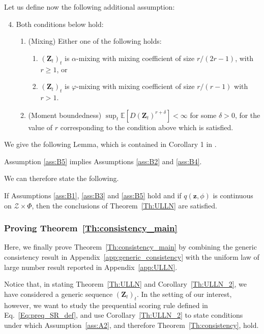 \documentclass[twoside,11pt]{article}
\newcommand{\E}{\mathbb{E}}
\newcommand{\ddz}{\mathbf{z}}
\newcommand{\Ddz}{\mathbf{Z}}
\begin{document}
	
	Let us define now the following additional assumption: 
	\begin{enumerate}[label=\textbf{C\arabic*}]
		\setcounter{enumi}{3}
		\item \label{ass:B5} 
		Both conditions below hold:
		\begin{enumerate}
			\item (Mixing) Either one of the following holds: 
			\begin{enumerate}
				\item $ (\Ddz_t)_t $ is $ \alpha $-mixing with mixing coefficient of size $ r/(2r-1) $, with $ r \ge 1 $, or
				\item $ (\Ddz_t)_t $ is $ \varphi $-mixing with mixing coefficient of size $ r/(r-1) $ with $ r > 1 $.
			\end{enumerate}
			\item  (Moment boundedness) $ \sup_t \E\left[D(\Ddz_t)^{r+\delta}\right] <\infty$ for some $ \delta>0 $, for the value of $ r $ corresponding to the condition above which is satisfied.
		\end{enumerate}
	\end{enumerate}
	
	
	We give the following Lemma, which is contained in Corollary 1 in \cite{potscher1989uniform}.
	
	\begin{lemma}
		Assumption \ref{ass:B5} implies Assumptions \ref{ass:B2} and \ref{ass:B4}.	
	\end{lemma}
	
	We can therefore state the following.
	\begin{corollary}\label{Th:ULLN_2}
		If Assumptions \ref{ass:B1}, \ref{ass:B3} and \ref{ass:B5} hold and if $ q(\ddz, \phi) $ is continuous on $ \mathcal{Z}\times \Phi $, then the conclusions of Theorem~\ref{Th:ULLN} are satisfied.
	\end{corollary}
	
	\subsubsection{Proving Theorem~\ref{Th:consistency_main}}\label{app:proof_consistency}
	Here, we finally prove Theorem~\ref{Th:consistency_main} by combining the generic consistency result in Appendix~\ref{app:generic_consistency} with the uniform law of large number result reported in Appendix~\ref{app:ULLN}.
	
	Notice that, in stating Theorem~\ref{Th:ULLN} and Corollary~\ref{Th:ULLN_2}, we have considered a generic sequence $  (\Ddz_t)_t  $. In the setting of our interest, however, we want to study the prequential scoring rule defined in Eq.~\eqref{Eq:preq_SR_def}, and use Corollary~\ref{Th:ULLN_2} to state conditions under which Assumption~\ref{ass:A2}, and therefore Theorem~\ref{Th:consistency}, hold.
	
\end{document}

